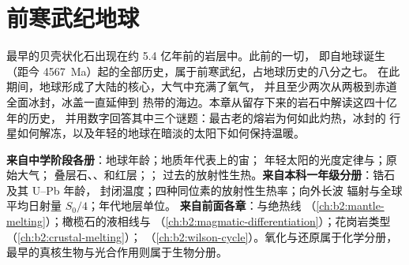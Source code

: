 \chapter{前寒武纪地球}\label{ch:b2:precambrian-earth}

最早的贝壳状化石出现在约 5.4 亿年前的岩层中。此前的一切，
即自地球诞生（距今 \qty{4567}{Ma}）起的全部历史，属于前寒武纪，占地球历史的八分之七。
在此期间，地球形成了大陆的核心，大气中充满了氧气，
并且至少两次从两极到赤道全面冰封，冰盖一直延伸到
热带的海边。本章从留存下来的岩石中解读这四十亿年的历史，
并用数字回答其中三个谜题：最古老的熔岩为何如此灼热，冰封的
行星如何解冻，以及年轻的地球在暗淡的太阳下如何保持温暖。

\begin{recall}
\textbf{来自中学阶段各册}：地球年龄；地质年代表上的宙；
年轻太阳的光度定律与；原始大气；
叠层石、、和红层；；
过去的放射性生热。\textbf{来自本科一年级分册}：锆石及其 U--Pb 年龄，
封闭温度；四种同位素的放射性生热率；向外长波
辐射与全球平均日射量 $S_0/4$；年代地层单位。
\textbf{来自前面各章}：与绝热线
（\cref{ch:b2:mantle-melting}）；橄榄石的液相线与
（\cref{ch:b2:magmatic-differentiation}）；花岗岩类型（\cref{ch:b2:crustal-melting}）；
（\cref{ch:b2:wilson-cycle}）。氧化与还原属于化学分册，
最早的真核生物与光合作用则属于生物分册。
\end{recall}

